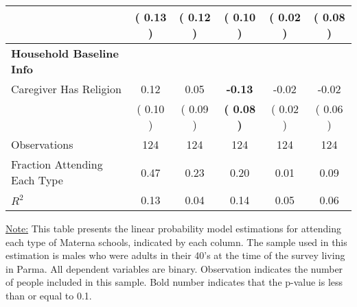 \begin{table}[H]
{\begin{tabular}{lccccc}
\quad  & \textbf{(     0.13 )} & (     0.12 )  & (     0.10 )  & (     0.02 ) & (     0.08 ) \\
\midrule
\textbf{Household Baseline Info} \\
\quad Caregiver Has Religion &      0.12 &      0.05 & \textbf{    -0.13} &     -0.02 &     -0.02 \\
\quad  & (     0.10 ) & (     0.09 )  & \textbf{(     0.08 )}  & (     0.02 ) & (     0.06 ) \\
\midrule
Observations & 124 & 124 & 124 & 124 & 124 \\
Fraction Attending Each Type &      0.47 &      0.23 &      0.20 &      0.01 &      0.09 \\
\midrule
$ R^2$ &      0.13 &      0.04 &      0.14 &      0.05 &      0.06 \\
\bottomrule
\end{tabular}}
\end{table}
\begin{footnotesize}
\noindent\underline{Note:} This table presents the linear probability model estimations for attending each type of Materna schools, indicated by each column. The sample used in this estimation is males who were adults in their 40's at the time of the survey living in Parma. All dependent variables are binary. Observation indicates the number of people included in this sample. Bold number indicates that the p-value is less than or equal to 0.1.
\end{footnotesize}
